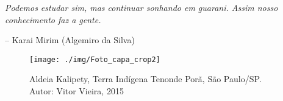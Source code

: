 
\vspace*{\fill}

\epigraph{\emph{Podemos estudar sim, mas continuar sonhando em guarani. Assim nosso conhecimento faz a gente.}}{-- Karai Mirim (Algemiro da Silva)}

\thispagestyle{empty}

\pagebreak


\begin{absolutelynopagebreak}
\begin{figure}[H]
\begin{adjustwidth}{-2.7cm}{}
\vspace{-3.1cm}
  \texttt{[image: ./img/Foto\_capa\_crop2]}
\end{adjustwidth}
\caption{Aldeia Kalipety, Terra Indígena Tenonde Porã, São Paulo/SP. Autor: Vitor Vieira, 2015}
\end{figure}
\end{absolutelynopagebreak}

\vspace*{\fill}

\thispagestyle{empty}